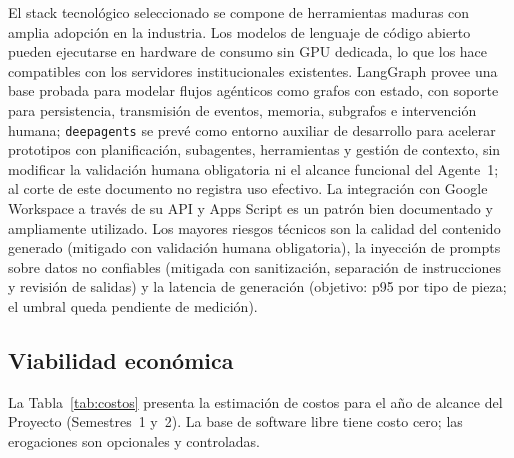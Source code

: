 \documentclass[a4paper, 12pt]{article}
\begin{document}
El stack tecnol\'ogico seleccionado se compone de herramientas maduras con amplia adopci\'on en la industria. Los modelos de lenguaje de c\'odigo abierto pueden ejecutarse en hardware de consumo sin GPU dedicada, lo que los hace compatibles con los servidores institucionales existentes. LangGraph provee una base probada para modelar flujos ag\'enticos como grafos con estado, con soporte para persistencia, transmisi\'on de eventos, memoria, subgrafos e intervenci\'on humana; \texttt{deepagents} se prev\'e como entorno auxiliar de desarrollo para acelerar prototipos con planificaci\'on, subagentes, herramientas y gesti\'on de contexto, sin modificar la validaci\'on humana obligatoria ni el alcance funcional del Agente~1; al corte de este documento no registra uso efectivo. La integraci\'on con Google Workspace a trav\'es de su API y Apps Script es un patr\'on bien documentado y ampliamente utilizado. Los mayores riesgos t\'ecnicos son la calidad del contenido generado (mitigado con validaci\'on humana obligatoria), la inyecci\'on de prompts sobre datos no confiables (mitigada con sanitizaci\'on, separaci\'on de instrucciones y revisi\'on de salidas) y la latencia de generaci\'on (objetivo: p95 por tipo de pieza; el umbral queda pendiente de medici\'on).

\subsection{Viabilidad econ\'omica}

La Tabla~\ref{tab:costos} presenta la estimaci\'on de costos para el a\~no de alcance del Proyecto (Semestres~1 y~2). La base de software libre tiene costo cero; las erogaciones son opcionales y controladas.
\end{document}
